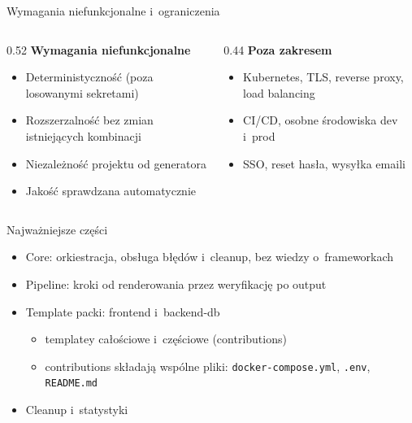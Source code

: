 \documentclass[aspectratio=169, 11pt]{beamer}
\begin{document}
\begin{frame}{Wymagania niefunkcjonalne i~ograniczenia}
  \begin{columns}[T]
    \begin{column}{0.52\textwidth}
      \textbf{Wymagania niefunkcjonalne}
      {\small
      \begin{itemize}
        \item Deterministyczność (poza losowanymi sekretami)
        \item Rozszerzalność bez zmian istniejących kombinacji
        \item Niezależność projektu od generatora
        \item Jakość sprawdzana automatycznie
      \end{itemize}
      }
    \end{column}
    \begin{column}{0.44\textwidth}
      \textbf{Poza zakresem}
      {\small
      \begin{itemize}
        \item Kubernetes, TLS, reverse proxy, load balancing
        \item CI/CD, osobne środowiska dev i~prod
        \item SSO, reset hasła, wysyłka emaili
      \end{itemize}
      }
    \end{column}
  \end{columns}
\end{frame}

\begin{frame}{Najważniejsze części}
  \begin{itemize}
    \item Core: orkiestracja, obsługa błędów i~cleanup, bez wiedzy o~frameworkach
    \item Pipeline: kroki od renderowania przez weryfikację po output
    \item Template packi: frontend i~backend-db
    \begin{itemize}
      \item template\textquotesingle{}y całościowe i~częściowe (contributions)
      \item contributions składają wspólne pliki: \texttt{docker-compose.yml}, \texttt{.env}, \texttt{README.md}
    \end{itemize}
    \item Cleanup i~statystyki
  \end{itemize}
\end{frame}
\end{document}
